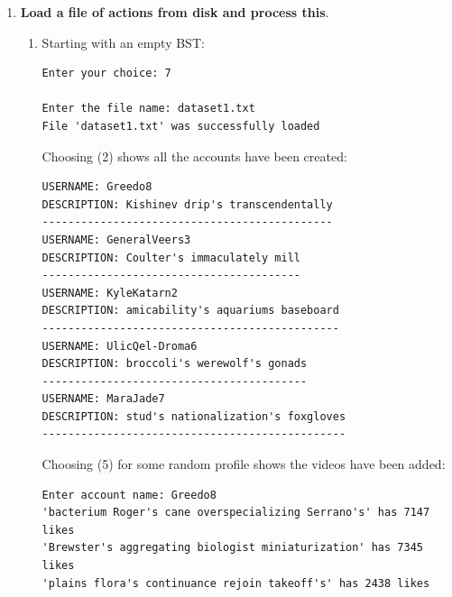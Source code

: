 \documentclass{assignment}
\begin{document}
\begin{enumerate}
\begin{enumerate}
\item Attempting to add an invalid description

\begin{center} \small { \color{gray}
\begin{BVerbatim} 
Enter account name: MaraJade7
Enter file name: video1000.mpg
Enter number of likes: 10
Enter the video description: 
The description '' cannot be blank

Enter account name: MaraJade7
Enter file name: video1000.mpg
Enter number of likes: 10
Enter the video description:    
The description '   ' cannot be only spaces
\end{BVerbatim} 
} \end{center} \color{black}

\end{enumerate}

\item \textbf{Load a file of actions from disk and process this}. 
\begin{enumerate}
    \item Starting with an empty BST:
\begin{center} \small { \color{gray}
\begin{BVerbatim} 
Enter your choice: 7

Enter the file name: dataset1.txt
File 'dataset1.txt' was successfully loaded

\end{BVerbatim} 
}
\end{center} \color{black}
Choosing (2) shows all the accounts have been created:

\begin{center} \small { \color{gray}
\begin{BVerbatim}
USERNAME: Greedo8
DESCRIPTION: Kishinev drip's transcendentally
---------------------------------------------
USERNAME: GeneralVeers3
DESCRIPTION: Coulter's immaculately mill
----------------------------------------
USERNAME: KyleKatarn2
DESCRIPTION: amicability's aquariums baseboard
----------------------------------------------
USERNAME: UlicQel-Droma6
DESCRIPTION: broccoli's werewolf's gonads
-----------------------------------------
USERNAME: MaraJade7
DESCRIPTION: stud's nationalization's foxgloves
-----------------------------------------------
\end{BVerbatim}
}
\end{center} \color{black}
Choosing (5) for some random profile shows the videos have been added:
\begin{center} \small { \color{gray}
\begin{BVerbatim}
Enter account name: Greedo8
'bacterium Roger's cane overspecializing Serrano's' has 7147 likes
'Brewster's aggregating biologist miniaturization' has 7345 likes
'plains flora's continuance rejoin takeoff's' has 2438 likes    
\end{BVerbatim} 
} \end{center} \color{black}
    

\end{enumerate}
\end{enumerate}
\end{document}
